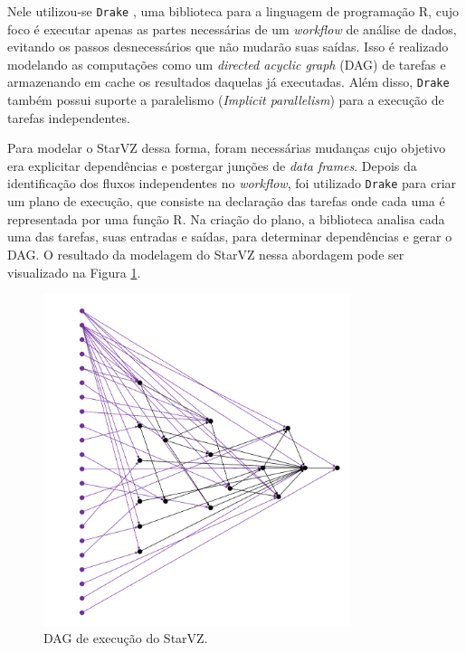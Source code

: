 Nele utilizou-se \texttt{Drake} \cite{ref:drake}, uma biblioteca para a 
linguagem de programação R, cujo foco é executar apenas as 
partes necessárias de um \emph{workflow} de análise de dados, evitando os 
passos 
desnecessários que não mudarão
suas saídas. Isso é realizado modelando as computações como um \emph{directed 
acyclic graph} (DAG) de tarefas e 
armazenando em cache os resultados daquelas já executadas. Além disso, 
\texttt{Drake} também possui suporte a paralelismo
(\emph{Implicit parallelism}) para a execução de tarefas independentes.

Para modelar o StarVZ dessa forma, foram necessárias mudanças cujo objetivo era 
explicitar 
dependências e postergar junções de \emph{data frames}. Depois da identificação 
dos fluxos independentes    
no \emph{workflow}, foi utilizado \texttt{Drake} para criar um plano de 
execução, que consiste na declaração
das tarefas onde cada uma é representada por uma função R. Na criação do plano, 
a biblioteca analisa cada
uma das tarefas, suas entradas e saídas, para determinar dependências e gerar o 
DAG. O resultado da modelagem do
StarVZ nessa abordagem pode ser visualizado na Figura \ref{fig:starvz-dag}.

\begin{figure}[ht]
\centerline{
\includegraphics[width=0.8\textwidth]{./img/drake-dag-final-origin.pdf}}
 \caption{DAG de execução do StarVZ.}
 \label{fig:starvz-dag}
\end{figure}

